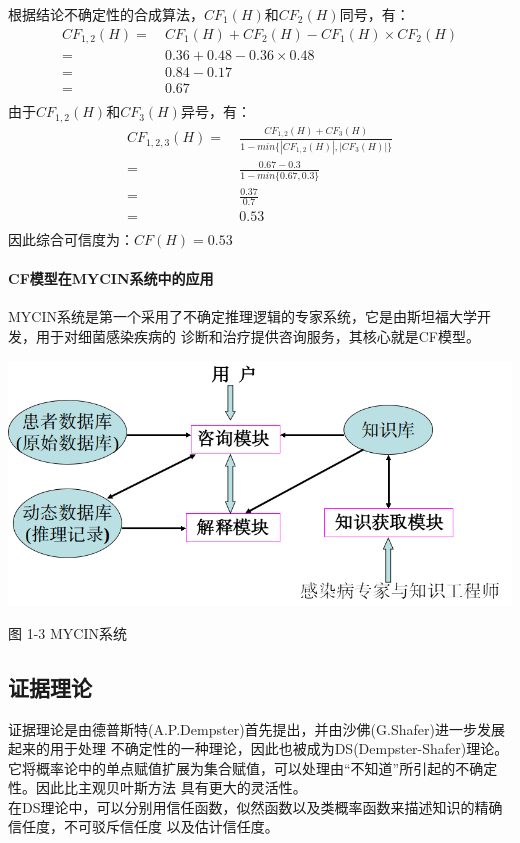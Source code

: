 \documentclass[12pt]{article}
\begin{document}
根据结论不确定性的合成算法，$CF_1(H)$和$CF_2(H)$同号，有：
\[
	\begin{aligned}
		CF_{1,2}(H)=&\ CF_1(H)+CF_2(H)-CF_1(H)\times CF_2(H)\\
		=&\ 0.36+0.48-0.36\times 0.48\\
		=&\ 0.84-0.17\\
		=&\ 0.67\\
	\end{aligned}
\]
由于$CF_{1,2}(H)$和$CF_3(H)$异号，有：
\[
	\begin{aligned}
		CF_{1,2,3}(H)=&\ \frac{CF_{1,2}(H)+CF_3(H)}{1-min\{|CF_{1,2}(H)|,|CF_3(H)|\}}\\
		=&\ \frac{0.67-0.3}{1-min\{0.67,0.3\}}\\
		=&\ \frac{0.37}{0.7}\\
		=&\ 0.53\\
	\end{aligned}
\]
因此综合可信度为：$CF(H)=0.53$\\
\paragraph{CF模型在MYCIN系统中的应用}
MYCIN系统是第一个采用了不确定推理逻辑的专家系统，它是由斯坦福大学开发，用于对细菌感染疾病的
诊断和治疗提供咨询服务，其核心就是CF模型。
\par
\centerline{\includegraphics[scale=0.5]{flowchart3.png}}
\centerline{图 1-3 MYCIN系统}
\par
\subsection{证据理论}
证据理论是由德普斯特(A.P.Dempster)首先提出，并由沙佛(G.Shafer)进一步发展起来的用于处理
不确定性的一种理论，因此也被成为DS(Dempster-Shafer)理论。\\
它将概率论中的单点赋值扩展为集合赋值，可以处理由“不知道”所引起的不确定性。因此比主观贝叶斯方法
具有更大的灵活性。\\
在DS理论中，可以分别用信任函数，似然函数以及类概率函数来描述知识的精确信任度，不可驳斥信任度
以及估计信任度。\\
\end{document}
